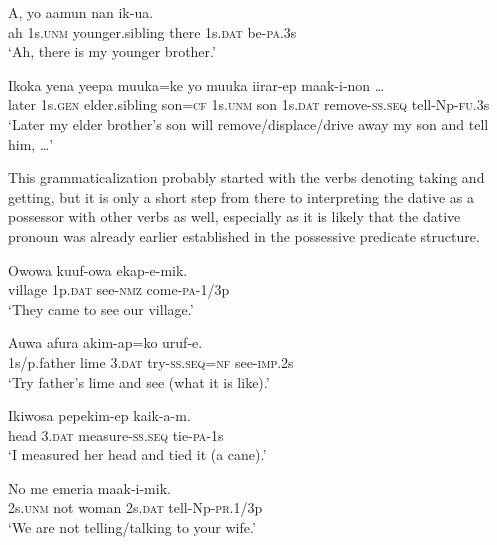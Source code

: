 \ea%
\label{ex:3:x1861}
\gll A, yo aamun nan  ik-ua. \\
ah 1s.\textsc{unm} younger.sibling there 1s.\textsc{dat} be-\textsc{pa}.3s\\
\glt`Ah, there is my younger brother.'
\z

\ea%
\label{ex:3:x1862}
\gll Ikoka yena yeepa muuka=ke yo muuka  iirar-ep maak-i-non {\dots}\\
later 1s.\textsc{gen} elder.sibling son=\textsc{cf} 1s.\textsc{unm} son 1s.\textsc{dat} remove-\textsc{ss}.\textsc{seq} tell-Np-\textsc{fu}.3s\\
\glt`Later my elder brother's son will remove/displace/drive away my son and tell him, {\dots}'
\z

This grammaticalization probably started with the verbs denoting taking and getting, but it is only a short step from there to interpreting the dative as a possessor with other verbs as well, especially as it is likely that the dative pronoun was already earlier established in the possessive predicate structure. 

\ea%
\label{ex:3:x1789}
\gll Owowa  kuuf-owa ekap-e-mik. \\
village 1p.\textsc{dat} see-\textsc{nmz} come-\textsc{pa}-1/3p\\
\glt`They came to see our village.'
\z

\ea%
\label{ex:3:x1791}
\gll Auwa afura  akim-ap=ko uruf-e. \\
1s/p.father lime 3.\textsc{dat} try-\textsc{ss}.\textsc{seq}=\textsc{nf} see-\textsc{imp}.2s\\
\glt`Try father's lime and see (what it is like).'
\z

\ea%
\label{ex:3:x1790}
\gll Ikiwosa  pepekim-ep kaik-a-m. \\
head 3.\textsc{dat} measure-\textsc{ss}.\textsc{seq} tie-\textsc{pa}-1s\\
\glt`I measured her head and tied it (a cane).'
\z

\ea%
\label{ex:3:x1795}
\gll No me emeria  maak-i-mik. \\
2s.\textsc{unm} not woman 2s.\textsc{dat} tell-Np-\textsc{pr}.1/3p\\
\glt`We are not telling/talking to your wife.'
\z

